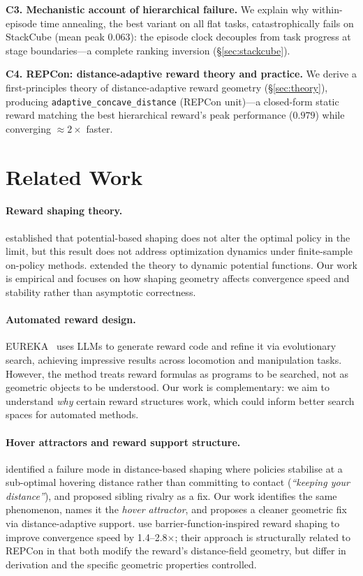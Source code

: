 \documentclass{article}
\newcommand{\m}[1]{\texttt{#1}}
\begin{document}
\noindent\textbf{C3. Mechanistic account of hierarchical failure.}
We explain why within-episode time annealing, the best variant on all flat tasks,
catastrophically fails on StackCube (mean peak $0.063$): the episode clock
decouples from task progress at stage boundaries---a complete ranking inversion
(\S\ref{sec:stackcube}).

\noindent\textbf{C4. REPCon: distance-adaptive reward theory and practice.}
We derive a first-principles theory of distance-adaptive reward geometry
(\S\ref{sec:theory}), producing \m{adaptive\_concave\_distance} (REPCon unit)---a
closed-form static reward matching the best hierarchical reward's peak performance
($0.979$) while converging $\approx\!2\times$ faster.

\section{Related Work}
\label{sec:related}

\paragraph{Reward shaping theory.}
\citet{ng1999shaping} established that potential-based shaping does not alter the
optimal policy in the limit, but this result does not address optimization dynamics
under finite-sample on-policy methods. \citet{devlin2012potential} extended the theory
to dynamic potential functions. Our work is empirical and focuses on how shaping
geometry affects convergence speed and stability rather than asymptotic correctness.

\paragraph{Automated reward design.}
EUREKA~\citep{ma2024eureka} uses LLMs to generate reward code and refine it via
evolutionary search, achieving impressive results across locomotion and manipulation
tasks. However, the method treats reward formulas as programs to be searched, not as
geometric objects to be understood. Our work is complementary: we aim to understand
\emph{why} certain reward structures work, which could inform better search spaces for
automated methods.

\paragraph{Hover attractors and reward support structure.}
\citet{trott2019keeping} identified a failure mode in distance-based shaping where
policies stabilise at a sub-optimal hovering distance rather than committing to contact
(\emph{``keeping your distance''}), and proposed sibling rivalry as a fix. Our work
identifies the same phenomenon, names it the \emph{hover attractor}, and proposes a
cleaner geometric fix via distance-adaptive support. \citet{nilaksh2024barrier} use
barrier-function-inspired reward shaping to improve convergence speed by 1.4--2.8$\times$;
their approach is structurally related to REPCon in that both modify the reward's
distance-field geometry, but differ in derivation and the specific geometric properties
controlled.
\end{document}
